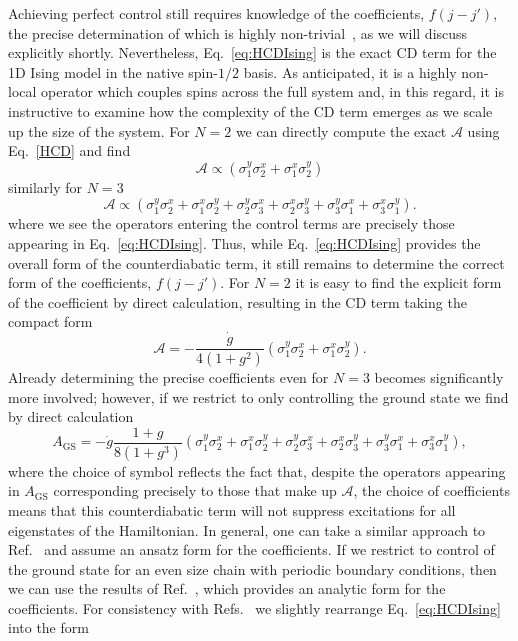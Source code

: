 Achieving perfect control still requires knowledge of the coefficients, $f(j-j')$, the precise determination of which is highly non-trivial~\cite{delCampo2012Assisted, damskiJSM2014}, as we will discuss explicitly shortly. Nevertheless, Eq.~\eqref{eq:HCDIsing} is the exact CD term for the 1D Ising model in the native spin-$1/2$ basis. As anticipated, it is a highly non-local operator which couples spins across the full system and, in this regard, it is instructive to examine how the complexity of the CD term emerges as we scale up the size of the system. For $N\!=\!2$ we can directly compute the exact $\mathcal{A}$ using Eq.~\eqref{HCD} and find
\begin{equation}
\mathcal{A} \propto \left(\sigma^y_1\sigma_2^x + \sigma^x_1\sigma_2^y \right)
\end{equation}
similarly for $N=3$ 
\begin{equation}
\mathcal{A}\propto\left( \sigma^y_1\sigma_2^x + \sigma^x_1\sigma_2^y + \sigma^y_2\sigma_3^x + \sigma^x_2\sigma_3^y + \sigma^y_3\sigma_1^x + \sigma^x_3\sigma_1^y\right).
\end{equation}
where we see the operators entering the control terms are precisely those appearing in Eq.~\eqref{eq:HCDIsing}. Thus, while Eq.~\eqref{eq:HCDIsing} provides the overall form of the counterdiabatic term, it still remains to determine the correct form of the coefficients, $f(j-j')$. For $N=2$ it is easy to find the explicit form of the coefficient by direct calculation, resulting in the CD term taking the compact form
\begin{equation}
\mathcal{A} =-\frac{\dot{g}}{4(1+g^2)} \left(\sigma^y_1\sigma_2^x + \sigma^x_1\sigma_2^y \right).
\end{equation}
Already determining the precise coefficients even for $N=3$ becomes significantly more involved; however, if we restrict to only controlling the ground state we find by direct calculation
\begin{equation}
A_\text{GS}= -\dot{g}\frac{1 + g}{8(1+g^3)}\left( \sigma^y_1\sigma_2^x + \sigma^x_1\sigma_2^y + \sigma^y_2\sigma_3^x + \sigma^x_2\sigma_3^y + \sigma^y_3\sigma_1^x + \sigma^x_3\sigma_1^y\right),
\end{equation}
where the choice of symbol reflects the fact that, despite the operators appearing in $A_\text{GS}$ corresponding precisely to those that make up $\mathcal{A}$, the choice of coefficients means that this counterdiabatic term will not suppress excitations for all eigenstates of the Hamiltonian. In general, one can take a similar approach to Ref.~\cite{delCampo2012Assisted} and assume an ansatz form for the coefficients. If we restrict to control of the ground state for an even size chain with periodic boundary conditions, then we can use the results of Ref.~\cite{damskiJSM2014}, which provides an analytic form for the coefficients. For consistency with Refs.~\cite{delCampo2012Assisted, damskiJSM2014} we slightly rearrange Eq.~\eqref{eq:HCDIsing} into the form
